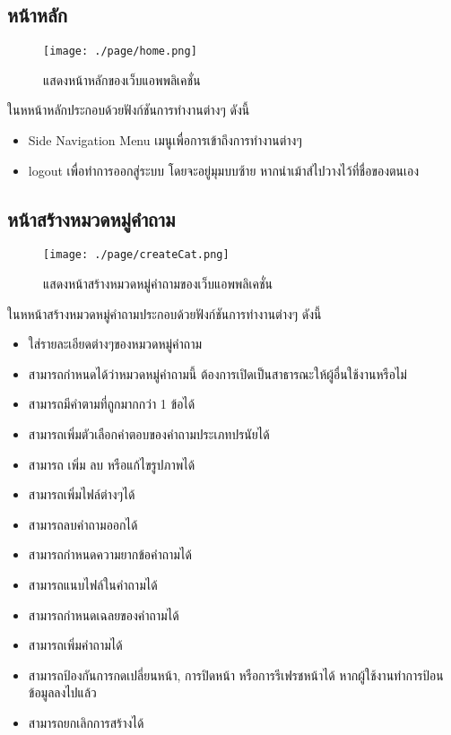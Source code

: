 \subsection{หน้าหลัก}
\begin{figure}[H]
  \centering
  \texttt{[image: ./page/home.png]}
  \caption{แสดงหน้าหลักของเว็บแอพพลิเคชั่น}
  \label{Fig:Homepage}
\end{figure}
ในหหน้าหลักประกอบด้วยฟังก์ชันการทำงานต่างๆ ดังนี้
\begin{itemize}
  \item Side Navigation Menu เมนูเพื่อการเข้าถึงการทำงานต่างๆ
  \item logout เพื่อทำการออกสู่ระบบ โดยจะอยู่มุมบบซ้าย หากนำเม้าส์ไปวางไว้ที่ชื่อของตนเอง
\end{itemize}

\subsection{หน้าสร้างหมวดหมู่คำถาม}
\begin{figure}[H]
  \centering
  \texttt{[image: ./page/createCat.png]}
  \caption{แสดงหน้าสร้างหมวดหมู่คำถามของเว็บแอพพลิเคชั่น}
  \label{Fig:createCat}
\end{figure}
ในหหน้าสร้างหมวดหมู่คำถามประกอบด้วยฟังก์ชันการทำงานต่างๆ ดังนี้
\begin{itemize}
  \item ใส่รายละเอียดต่างๆของหมวดหมู่คำถาม
  \item สามารถกำหนดได้ว่าหมวดหมู่คำถามนี้ ต้องการเปิดเป็นสาธารณะให้ผู้อื่นใช้งานหรือไม่
  \item สามารถมีคำตามที่ถูกมากกว่า 1 ข้อได้
  \item สามารถเพิ่มตัวเลือกคำตอบของคำถามประเภทปรนัยได้
  \item สามารถ เพิ่ม ลบ หรือแก้ไขรูปภาพได้
  \item สามารถเพิ่มไฟล์ต่างๆได้
  \item สามารถลบคำถามออกได้
  \item สามารถกำหนดความยากข้อคำถามได้
  \item สามารถแนบไฟล์ในคำถามได้
  \item สามารถกำหนดเฉลยของคำถามได้
  \item สามารถเพิ่มคำถามได้
  \item สามารถป้องกันการกดเปลี่ยนหน้า, การปิดหน้า หรือการรีเฟรชหน้าได้ หากผู้ใช้งานทำการป้อนข้อมูลลงไปแล้ว
  \item สามารถยกเลิกการสร้างได้
\end{itemize}

